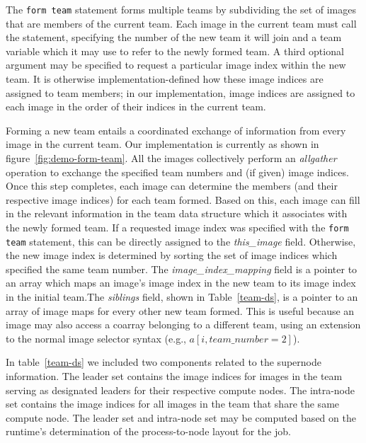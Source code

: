 
The \texttt{form team} statement forms multiple teams by subdividing the set
of images that are members of the current team. Each image in the current
team must call the statement, specifying the number of the new team it will
join and a team variable which it may use to refer to the newly formed team. A
third optional argument may be specified to request a particular image index
within the new team. It is otherwise implementation-defined how these image
indices are assigned to team members; in our implementation, image indices are
assigned to each image in the order of their indices in the current team.

Forming a new team entails a coordinated exchange of information from every
image in the current team. Our implementation is currently as shown in figure~\ref{fig:demo-form-team}. All the
images collectively perform an \textit{allgather} operation to exchange the
specified team numbers and (if given) image indices. Once this step completes,
each image can determine the members (and their respective image indices) for
each team formed. Based on this, each image can fill in the relevant
information in the team data structure which it associates with the newly
formed team. If a requested image index was specified with the \texttt{form
team} statement, this can be directly assigned to the \textit{this\_image}
field. Otherwise, the new image index is determined by sorting the set of
image indices which specified the same team number. The
\textit{image\_index\_mapping} field is a pointer to an array which maps an
image's image index in the new team to its image index in the initial team.The \textit{siblings}
field, shown in Table~\ref{team-ds}, is a pointer to an array of image maps
for every other new team formed. This is useful because an image may also
access a coarray belonging to a different team, using an extension to the
normal image selector syntax (e.g., $a[i, team\_number=2]$).  


In table~\ref{team-ds} we included two components related to the supernode information. The leader set contains the image indices for images in the team serving as designated leaders
for their respective compute nodes. The intra-node set contains the
image indices for all images in the team that share the same compute node.
The leader set and intra-node set may be computed based on the runtime's
determination of the process-to-node layout for the job. 

